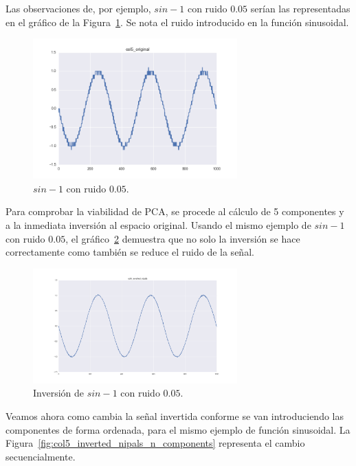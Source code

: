 \documentclass[11pt,spanish,listoffigures,listoftables]{tfgetsinf}
\begin{document}
	Las observaciones de, por ejemplo, \(sin - 1\) con ruido \(0.05\) serían las representadas en el gráfico de la Figura~\ref{fig:col5_original}. Se nota el ruido introducido en la función sinusoidal.
	
        \begin{figure}[H]
            \centering
            \includegraphics[width=0.7\textwidth]{simulated_data_8_columns/col5_original.png}
            \caption{\(sin - 1\) con ruido \(0.05\).}
            \label{fig:col5_original}
        \end{figure}

	Para comprobar la viabilidad de PCA, se procede al cálculo de 5 componentes y a la inmediata inversión al espacio original. Usando el mismo ejemplo de \(sin - 1\) con ruido \(0.05\), el gráfico~\ref{fig:col5_inverted_nipals} demuestra que no solo la inversión se hace correctamente como también se reduce el ruido de la señal.

        \begin{figure}[H]
            \centering
            \includegraphics[width=0.7\textwidth]{col5_inverted_nipals.png}
            \caption{Inversión de \(sin - 1\) con ruido \(0.05\).}
            \label{fig:col5_inverted_nipals}
        \end{figure}
        
        Veamos ahora como cambia la señal invertida conforme se van introduciendo las componentes de forma ordenada, para el mismo ejemplo de función sinusoidal. La Figura~\ref{fig:col5_inverted_nipals_n_components} representa el cambio secuencialmente. 
        
\end{document}
